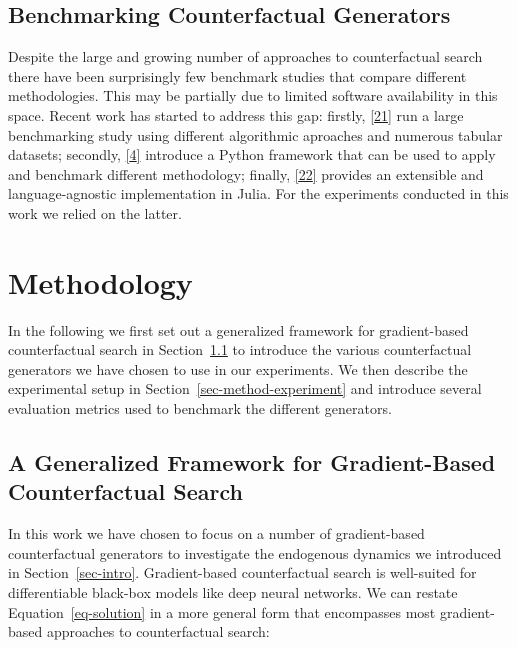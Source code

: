 \documentclass[
  conference]{IEEEtran}
\begin{document}
\hypertarget{sec-related-benchmark}{%
\subsection{Benchmarking Counterfactual
Generators}\label{sec-related-benchmark}}

Despite the large and growing number of approaches to counterfactual
search there have been surprisingly few benchmark studies that compare
different methodologies. This may be partially due to limited software
availability in this space. Recent work has started to address this gap:
firstly, \protect\hyperlink{ref-de2021framework}{{[}21{]}} run a large
benchmarking study using different algorithmic aproaches and numerous
tabular datasets; secondly,
\protect\hyperlink{ref-pawelczyk2021carla}{{[}4{]}} introduce a Python
framework that can be used to apply and benchmark different methodology;
finally,
\protect\hyperlink{ref-altmeyer2022CounterfactualExplanations}{{[}22{]}}
provides an extensible and language-agnostic implementation in Julia.
For the experiments conducted in this work we relied on the latter.

\hypertarget{sec-method}{%
\section{Methodology}\label{sec-method}}

In the following we first set out a generalized framework for
gradient-based counterfactual search in Section~\ref{sec-method-general}
to introduce the various counterfactual generators we have chosen to use
in our experiments. We then describe the experimental setup in
Section~\ref{sec-method-experiment} and introduce several evaluation
metrics used to benchmark the different generators.

\hypertarget{sec-method-general}{%
\subsection{A Generalized Framework for Gradient-Based Counterfactual
Search}\label{sec-method-general}}

In this work we have chosen to focus on a number of gradient-based
counterfactual generators to investigate the endogenous dynamics we
introduced in Section~\ref{sec-intro}. Gradient-based counterfactual
search is well-suited for differentiable black-box models like deep
neural networks. We can restate Equation~\ref{eq-solution} in a more
general form that encompasses most gradient-based approaches to
counterfactual search:
\end{document}
